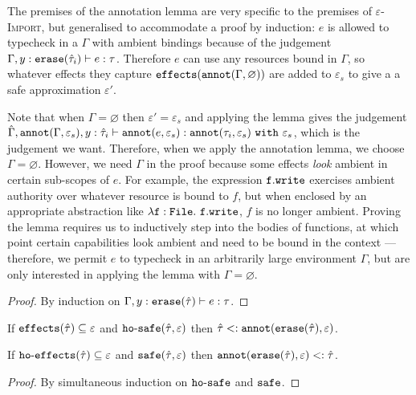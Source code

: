 The premises of the annotation lemma are very specific to the premises of \textsc{$\varepsilon$-Import}, but generalised to accommodate a proof by induction: $e$ is allowed to typecheck in a $\Gamma$ with ambient bindings because of the judgement $\Gamma, y: \mathtt{erase}(\hat \tau_i) \vdash e: \tau$. Therefore $e$ can use any resources bound in $\Gamma$, so whatever effects they capture $\mathtt{effects}(\mathtt{annot}(\Gamma, \varnothing))$ are added to $\varepsilon_{s}$ to give a a safe approximation $\varepsilon'$.

Note that when $\Gamma = \varnothing$ then $\varepsilon' = \varepsilon_s$ and applying the lemma gives the judgement $\hat \Gamma, \mathtt{annot}(\Gamma, \varepsilon_s), y: \hat \tau_i \vdash \mathtt{annot}(e, \varepsilon_s) : \mathtt{annot}(\tau_i, \varepsilon_s)~\mathtt{with}~ \varepsilon_s$, which is the judgement we want. Therefore, when we apply the annotation lemma, we choose $\Gamma = \varnothing$. However, we need $\Gamma$ in the proof because some effects \textit{look} ambient in certain sub-scopes of $e$. For example, the expression $\mathtt{f.write}$ exercises ambient authority over whatever resource is bound to $f$, but when enclosed by an appropriate abstraction like $\mathtt{\lambda f: {File}.~f.write}$, $f$ is no longer ambient. Proving the lemma requires us to inductively step into the bodies of functions, at which point certain capabilities look ambient and need to be bound in the context --- therefore, we permit $e$ to typecheck in an arbitrarily large environment $\Gamma$, but are only interested in applying the lemma with $\Gamma = \varnothing$.

\begin{proof}
By induction on $\Gamma, y: \mathtt{erase}(\hat \tau) \vdash e: \tau$.
\end{proof}

\begin{lemma}
If $\mathtt{effects}(\hat \tau) \subseteq \varepsilon$ and $\mathtt{ho \hbox{-} safe}(\hat \tau, \varepsilon)$ then $\hat \tau <: \mathtt{annot}(\mathtt{erase}(\hat \tau), \varepsilon)$.
\end{lemma}

\begin{lemma}
If $\mathtt{ho \hbox{-} effects}(\hat \tau) \subseteq \varepsilon$ and $\mathtt{safe}(\hat \tau, \varepsilon)$ then $\mathtt{annot(erase}(\hat \tau), \varepsilon) <: \hat \tau$.
\end{lemma}

\begin{proof}
By simultaneous induction on $\mathtt{ho \hbox{-} safe}$ and $\mathtt{safe}$.
\end{proof}

